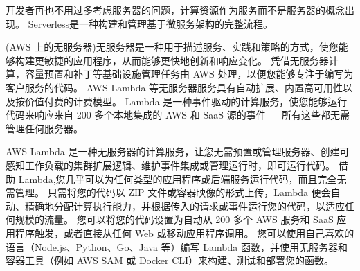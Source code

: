 \begin{definition}[Serverless]
    开发者再也不用过多考虑服务器的问题，计算资源作为服务而不是服务器的概念出现。 Serverless是一种构建和管理基于微服务架构的完整流程。

    (AWS 上的无服务器)无服务器是一种用于描述服务、实践和策略的方式，使您能够构建更敏捷的应用程序，从而能够更快地创新和响应变化。 凭借无服务器计算，容量预置和补丁等基础设施管理任务由 AWS 处理，以便您能够专注于编写为客户服务的代码。 AWS Lambda 等无服务器服务具有自动扩展、内置高可用性以及按价值付费的计费模型。 Lambda 是一种事件驱动的计算服务，使您能够运行代码来响应来自 200 多个本地集成的 AWS 和 SaaS 源的事件 — 所有这些都无需管理任何服务器。 
\end{definition}

\begin{definition}
    AWS Lambda 是一种无服务器的计算服务，让您无需预置或管理服务器、创建可感知工作负载的集群扩展逻辑、维护事件集成或管理运行时，即可运行代码。 借助 Lambda,您几乎可以为任何类型的应用程序或后端服务运行代码，而且完全无需管理。 只需将您的代码以 ZIP 文件或容器映像的形式上传，Lambda 便会自动、精确地分配计算执行能力，并根据传入的请求或事件运行您的代码，以适应任何规模的流量。 您可以将您的代码设置为自动从 200 多个 AWS 服务和 SaaS 应用程序触发，或者直接从任何 Web 或移动应用程序调用。 您可以使用自己喜欢的语言（Node.js、Python、Go、Java 等）编写 Lambda 函数，并使用无服务器和容器工具（例如 AWS SAM 或 Docker CLI）来构建、测试和部署您的函数。 
\end{definition}

